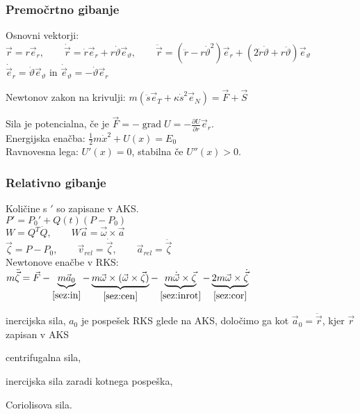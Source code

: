 \documentclass[a4paper,10pt]{article}
\title{\mytitle}
\author{Jure Slak}
\date{\today}
\theoremstyle{definition}
\newenvironment{enumerate*}%
{
\vspace{-6pt}
\begin{enumerate}[(1)]
\setlength{\itemsep}{0pt}
\setlength{\parskip}{2pt}
}
{\end{enumerate}}
\DeclareMathOperator{\grad}{grad}
\let\theta\vartheta
\newcommand{\vzeta}{\vec{\zeta}}
\newcommand{\dzeta}{\dot{\vzeta}}
\newcommand{\ddzeta}{\ddot{\vzeta}}
\newcommand{\vomega}{\vec{\omega}}
\newcommand{\domega}{\dot{\vomega}}
\newcommand{\va}{\vec{a}}
\newcommand{\vr}{\vec{r}}
\newcommand{\dr}{\dot{\vr}}
\newcommand{\ddr}{\ddot{\vr}}
\newcommand{\er}{\vec{e}_r}
\newcommand{\eq}{\vec{e}_{\theta}}
\begin{document}
\subsubsection*{Premočrtno gibanje}
Osnovni vektorji: $\vr = r\er, \qquad \dr = \dot{r}\er + r\dot{\theta}\eq,
\qquad \ddr = (\ddot{r} - r\dot{\theta}^2)\er + (2\dot{r}\dot{\theta} +
r\ddot{\theta})\eq$ \\
$\dot{\vec{e}}_r = \dot{\theta} \eq$ in $\dot{\vec{e}}_{\theta} = - \dot{\theta} \er$

Newtonov zakon na krivulji: $m(\ddot{s}\vec{e}_T + \kappa\dot{s}^2\vec{e}_N)
= \vec{F} + \vec{S}$

Sila je potencialna, če je $\vec{F} = -\grad U = - \frac{\partial U}{\partial
r}\er$. \\
Energijska enačba: $\frac12m\dot{x}^2 + U(x) = E_0$ \\
Ravnovesna lega: $U'(x) = 0$, stabilna če $U''(x) > 0$.

\subsubsection*{Relativno gibanje}
Količine s $'$ so zapisane v AKS. \\
$P' = P_0' + Q(t)(P-P_0)$ \\
$W = Q^T\dot{Q}, \qquad  W\va = \vomega \times \va$ \\
$\vzeta = P - P_0, \qquad \vec{v}_{rel} = \dzeta, \qquad \va_{rel} =
\ddzeta$
\\
Newtonove enačbe v RKS: \\[6pt]
$m\ddzeta = \vec{F} -
\underbrace{m\va_0}_{\eqref{sez:in}} -
\underbrace{m\vomega \times (\vomega \times \vzeta)}_{\eqref{sez:cen}} -
\underbrace{m\domega\times\vzeta}_{\eqref{sez:inrot}} -
\underbrace{2m\vomega\times\dzeta}_{\eqref{sez:cor}}$

\begin{enumerate*}
  \item inercijska sila, $a_0$ je pospešek RKS glede na AKS,  določimo ga kot
      $\vec{a}_0 = \ddot{\vec{r}}$, kjer $\vec{r}$ zapisan v AKS \label{sez:in}
  \item centrifugalna sila,                                   \label{sez:cen}
  \item inercijska sila zaradi kotnega pospeška,              \label{sez:inrot}
  \item Coriolisova sila.                                     \label{sez:cor}
\end{enumerate*}
\end{document}
